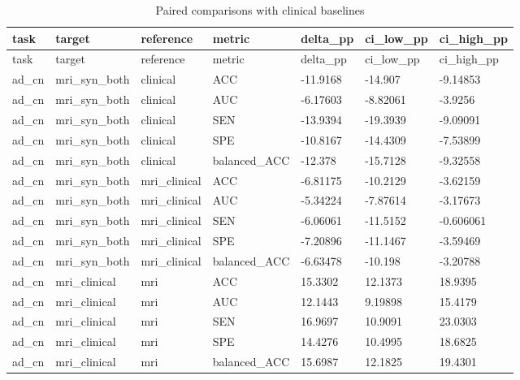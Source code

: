 \documentclass{article}
\begin{document}
\begin{landscape}
\begingroup
\footnotesize
\setlength{\tabcolsep}{4pt}
\begin{longtable}{lllllll}
\caption{Paired comparisons with clinical baselines}\label{tab:classification_clinical_comparisons}\\
\toprule
task & target & reference & metric & delta\_pp & ci\_low\_pp & ci\_high\_pp \\
\midrule
\endfirsthead
\toprule
task & target & reference & metric & delta\_pp & ci\_low\_pp & ci\_high\_pp \\
\midrule
\endhead
\bottomrule
\endfoot
ad\_cn & mri\_syn\_both & clinical & ACC & -11.9168 & -14.907 & -9.14853 \\
ad\_cn & mri\_syn\_both & clinical & AUC & -6.17603 & -8.82061 & -3.9256 \\
ad\_cn & mri\_syn\_both & clinical & SEN & -13.9394 & -19.3939 & -9.09091 \\
ad\_cn & mri\_syn\_both & clinical & SPE & -10.8167 & -14.4309 & -7.53899 \\
ad\_cn & mri\_syn\_both & clinical & balanced\_ACC & -12.378 & -15.7128 & -9.32558 \\
ad\_cn & mri\_syn\_both & mri\_clinical & ACC & -6.81175 & -10.2129 & -3.62159 \\
ad\_cn & mri\_syn\_both & mri\_clinical & AUC & -5.34224 & -7.87614 & -3.17673 \\
ad\_cn & mri\_syn\_both & mri\_clinical & SEN & -6.06061 & -11.5152 & -0.606061 \\
ad\_cn & mri\_syn\_both & mri\_clinical & SPE & -7.20896 & -11.1467 & -3.59469 \\
ad\_cn & mri\_syn\_both & mri\_clinical & balanced\_ACC & -6.63478 & -10.198 & -3.20788 \\
ad\_cn & mri\_clinical & mri & ACC & 15.3302 & 12.1373 & 18.9395 \\
ad\_cn & mri\_clinical & mri & AUC & 12.1443 & 9.19898 & 15.4179 \\
ad\_cn & mri\_clinical & mri & SEN & 16.9697 & 10.9091 & 23.0303 \\
ad\_cn & mri\_clinical & mri & SPE & 14.4276 & 10.4995 & 18.6825 \\
ad\_cn & mri\_clinical & mri & balanced\_ACC & 15.6987 & 12.1825 & 19.4301 \\

\end{longtable}
\end{landscape}
\end{document}
